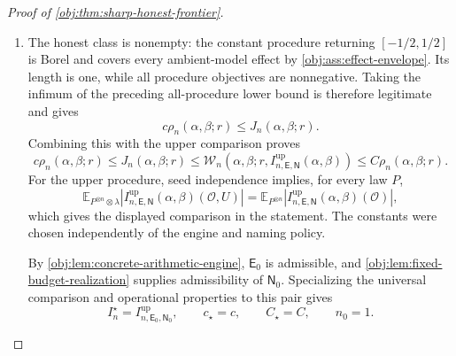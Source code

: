 \begin{proof}[Proof of \cref{obj:thm:sharp-honest-frontier}]
\begin{enumerate}
For the radius bound, \(r>0\) is covered above. At \(r=0\), nonnegativity of
interval length gives
\[
c_{\mathrm{radius}}\,0\,n^{-\mathsf b(\beta)}
=0\le\mathcal W_n(\alpha,\beta;0,I).
\]
Thus
\[
c_{\mathrm{radius}}r n^{-\mathsf b(\beta)}
\le\mathcal W_n(\alpha,\beta;r,I)
\qquad(0\le r\le1/2).
\]

Each summand of \(\rho_n\) is nonnegative. Reducing both coefficients to
their minimum and adding the two lower inequalities yields
\[
\begin{aligned}
c\rho_n(\alpha,\beta;r)
&=
\frac{\min\{c_{\mathrm{numerator}},c_{\mathrm{radius}}\}}2
\left[n^{-\mathsf a(\alpha,\beta)}
+r n^{-\mathsf b(\beta)}\right]\\
&\le
\frac12\left[
\mathcal W_n(\alpha,\beta;r,I)
+\mathcal W_n(\alpha,\beta;r,I)
\right]\\
&=\mathcal W_n(\alpha,\beta;r,I).
\end{aligned}
\]
This is the asserted converse for every honest procedure, including
independently randomized procedures.

\item The honest class is nonempty: the constant procedure returning
\([-1/2,1/2]\) is Borel and covers every ambient-model effect by
\cref{obj:ass:effect-envelope}. Its length is one, while all procedure
objectives are nonnegative. Taking the infimum of the preceding
all-procedure lower bound is therefore legitimate and gives
\[
c\rho_n(\alpha,\beta;r)\le J_n(\alpha,\beta;r).
\]
Combining this with the upper comparison proves
\[
c\rho_n(\alpha,\beta;r)
\le J_n(\alpha,\beta;r)
\le
\mathcal W_n\!\left(
\alpha,\beta;r,I^{\mathrm{up}}_{n,\mathsf E,\mathsf N}(\alpha,\beta)
\right)
\le C\rho_n(\alpha,\beta;r).
\]
For the upper procedure, seed independence implies, for every law \(P\),
\[
\mathbb E_{P^{\otimes n}\otimes\lambda}
\left|I^{\mathrm{up}}_{n,\mathsf E,\mathsf N}(\alpha,\beta)(\mathcal O,U)\right|
=
\mathbb E_{P^{\otimes n}}
\left|I^{\mathrm{up}}_{n,\mathsf E,\mathsf N}(\alpha,\beta)(\mathcal O)\right|,
\]
which gives the displayed comparison in the statement. The constants were
chosen independently of the engine and naming policy.

By \cref{obj:lem:concrete-arithmetic-engine},
\(\mathsf E_0\) is admissible, and
\cref{obj:lem:fixed-budget-realization} supplies admissibility of
\(\mathsf N_0\). Specializing the universal comparison and operational
properties to this pair gives
\[
I_n^\star=I^{\mathrm{up}}_{n,\mathsf E_0,\mathsf N_0},
\qquad c_\star=c,\qquad C_\star=C,\qquad n_0=1.
\]


\end{enumerate}
\end{proof}
